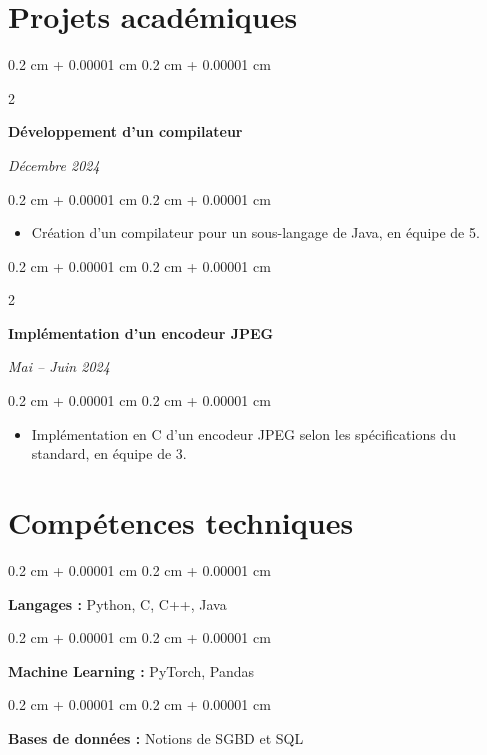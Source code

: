 \documentclass[10pt, letterpaper]{article}
\newenvironment{highlights}{
    \begin{itemize}[
        topsep=0.10 cm,
        parsep=0.10 cm,
        partopsep=0pt,
        itemsep=0pt,
        leftmargin=0.4 cm + 10pt
    ]
}{
    \end{itemize}
} %
\newenvironment{onecolentry}{
    \begin{adjustwidth}{
        0.2 cm + 0.00001 cm
    }{
        0.2 cm + 0.00001 cm
    }
}{
    \end{adjustwidth}
} %
\newenvironment{twocolentry}[2][]{
    \onecolentry
    \def\secondColumn{#2}
    \setcolumnwidth{\fill, 4.5 cm}
    \begin{paracol}{2}
}{
    \switchcolumn \raggedleft \secondColumn
    \end{paracol}
    \endonecolentry
} %
\begin{document}
\section{Projets académiques}


\begin{twocolentry}{\textit{Décembre 2024}}
    \textbf{Développement d’un compilateur}
\end{twocolentry}

\vspace{0.10cm}
\begin{onecolentry}
    \begin{highlights}
        \item Création d’un compilateur pour un sous-langage de Java, en équipe de 5.
    \end{highlights}
\end{onecolentry}


\vspace{0.3cm}
\begin{twocolentry}{\textit{Mai – Juin 2024}}
    \textbf{Implémentation d’un encodeur JPEG}
\end{twocolentry}

\vspace{0.10cm}
\begin{onecolentry}
    \begin{highlights}
        \item Implémentation en C d’un encodeur JPEG selon les spécifications du standard, en équipe de 3.
    \end{highlights}
\end{onecolentry}



\section{Compétences techniques}

\begin{onecolentry}
    \textbf{Langages :} Python, C, C++, Java
\end{onecolentry}

\vspace{0.2 cm}

\begin{onecolentry}
    \textbf{Machine Learning :} PyTorch, Pandas
\end{onecolentry}

\vspace{0.2 cm}

\begin{onecolentry}
    \textbf{Bases de données :} Notions de SGBD et SQL
\end{onecolentry}
\end{document}
